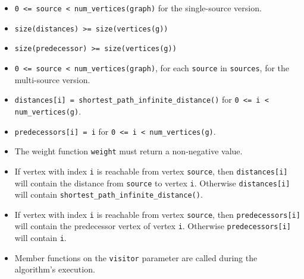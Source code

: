 \begin{itemdescr}
      \pnum\hardprecond
            \begin{itemize}
                  \item \lstinline{0 <= source < num_vertices(graph)} for the single-source version.
                  \item \lstinline{size(distances) >= size(vertices(g))}
                  \item \lstinline{size(predecessor) >= size(vertices(g))}
            \end{itemize}
      \pnum\preconditions
            \begin{itemize}
                  \item
                        \lstinline{0 <= source < num_vertices(graph)}, for each \lstinline{source} in \lstinline{sources}, 
                                   for the multi-source version.
                  \item
                        \lstinline{distances[i] = shortest_path_infinite_distance()} for \lstinline{0 <= i < num_vertices(g)}.
                  \item
                        \lstinline{predecessors[i] = i} for \lstinline{0 <= i < num_vertices(g)}.
                  \item
                        The weight function \lstinline{weight} must return a non-negative value.
            \end{itemize}
      \pnum\effects
            \begin{itemize}
                  \item
                        If vertex with index \lstinline{i} is reachable from vertex \lstinline{source}, then
                        \lstinline{distances[i]} will contain the distance from \lstinline{source} to vertex
                        \lstinline{i}.  Otherwise \lstinline{distances[i]} will contain
                        \lstinline{shortest_path_infinite_distance()}.
                  \item
                        If vertex with index \lstinline{i} is reachable
                        from vertex \lstinline{source}, then \lstinline{predecessors[i]} will contain the
                        predecessor vertex of vertex \lstinline{i}. Otherwise \lstinline{predecessors[i]} will contain
                        \lstinline{i}.
                  \item Member functions on the \lstinline{visitor} parameter are called during the algorithm's execution.

\end{itemize}
\end{itemdescr}

